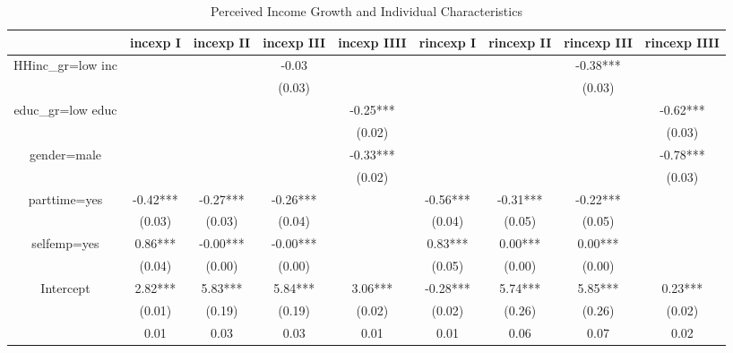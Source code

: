 \begin{table}[p]
\centering
\begin{adjustbox}{width={\textwidth}}
\begin{threeparttable}
\caption{Perceived Income Growth and Individual Characteristics}
\label{micro_reg_exp}\begin{tabular}{ccccccccc}
\toprule
{} &  incexp I & incexp II & incexp III & incexp IIII & rincexp I & rincexp II & rincexp III & rincexp IIII \\
\midrule
HHinc\_gr=low inc &           &           &      -0.03 &             &           &            &    -0.38*** &              \\
                 &           &           &     (0.03) &             &           &            &      (0.03) &              \\
educ\_gr=low educ &           &           &            &    -0.25*** &           &            &             &     -0.62*** \\
                 &           &           &            &      (0.02) &           &            &             &       (0.03) \\
gender=male      &           &           &            &    -0.33*** &           &            &             &     -0.78*** \\
                 &           &           &            &      (0.02) &           &            &             &       (0.03) \\
parttime=yes     &  -0.42*** &  -0.27*** &   -0.26*** &             &  -0.56*** &   -0.31*** &    -0.22*** &              \\
                 &    (0.03) &    (0.03) &     (0.04) &             &    (0.04) &     (0.05) &      (0.05) &              \\
selfemp=yes      &   0.86*** &  -0.00*** &   -0.00*** &             &   0.83*** &    0.00*** &     0.00*** &              \\
                 &    (0.04) &    (0.00) &     (0.00) &             &    (0.05) &     (0.00) &      (0.00) &              \\
Intercept        &   2.82*** &   5.83*** &    5.84*** &     3.06*** &  -0.28*** &    5.74*** &     5.85*** &      0.23*** \\
                 &    (0.01) &    (0.19) &     (0.19) &      (0.02) &    (0.02) &     (0.26) &      (0.26) &       (0.02) \\
                 &      0.01 &      0.03 &       0.03 &        0.01 &      0.01 &       0.06 &        0.07 &         0.02 \\

\end{tabular}
\end{threeparttable}
\end{adjustbox}
\end{table}

